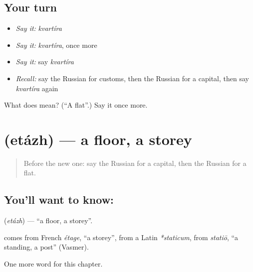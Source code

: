 \subsection*{Your turn}
\begin{itemize}
\raggedright
  \item \emph{Say it:} \emph{kvartíra}
  \item \emph{Say it:} \emph{kvartíra}, once more
  \item \emph{Say it:} say \emph{kvartíra}
  \item \emph{Recall:} say the Russian for customs, then the Russian for a capital, then say \emph{kvartíra} again
\end{itemize}

\begin{tcolorbox}[breakable,colback=teal!4,colframe=teal!35!black,title={Before you move on}]
What does  mean? (\textquotedblleft{}A flat\textquotedblright{}.) Say it once more.
\end{tcolorbox}
\section[\texorpdfstring{\ru{этаж} (etázh)}{этаж (etázh)}]{ (etázh) — a floor, a storey}

\label{lesson:RU-C213-etazh}



\begin{quote}
Before the new one: say the Russian for a capital, then the Russian for a flat.
\end{quote}

\subsection*{You'll want to know: }
\textbf{} (\emph{etázh}) — \textquotedblleft{}a floor, a storey\textquotedblright{}.

\begin{cousinweb}
\textbf{} comes from French \emph{étage}, \textquotedblleft{}a storey\textquotedblright{}, from a Latin \emph{*staticum}, from \emph{statiō}, \textquotedblleft{}a standing, a post\textquotedblright{} (Vasmer).
\end{cousinweb}

\begin{grammarlens}[title={What you've built}]
One more word for this chapter.
\end{grammarlens}

